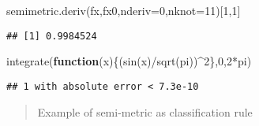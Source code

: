 \documentclass[
]{book}
\newenvironment{Shaded}{\begin{snugshade}}{\end{snugshade}}
\newcommand{\AttributeTok}[1]{\textcolor[rgb]{0.77,0.63,0.00}{#1}}
\newcommand{\CommentTok}[1]{\textcolor[rgb]{0.56,0.35,0.01}{\textit{#1}}}
\newcommand{\ControlFlowTok}[1]{\textcolor[rgb]{0.13,0.29,0.53}{\textbf{#1}}}
\newcommand{\DecValTok}[1]{\textcolor[rgb]{0.00,0.00,0.81}{#1}}
\newcommand{\FunctionTok}[1]{\textcolor[rgb]{0.00,0.00,0.00}{#1}}
\newcommand{\NormalTok}[1]{#1}
\newcommand{\OtherTok}[1]{\textcolor[rgb]{0.56,0.35,0.01}{#1}}
\newcommand{\SpecialCharTok}[1]{\textcolor[rgb]{0.00,0.00,0.00}{#1}}
\begin{document}
\begin{Shaded}
\begin{Highlighting}[]
\FunctionTok{semimetric.deriv}\NormalTok{(fx,fx0,}\AttributeTok{nderiv=}\DecValTok{0}\NormalTok{,}\AttributeTok{nknot=}\DecValTok{11}\NormalTok{)[}\DecValTok{1}\NormalTok{,}\DecValTok{1}\NormalTok{]}
\end{Highlighting}
\end{Shaded}

\begin{verbatim}
## [1] 0.9984524
\end{verbatim}

\begin{Shaded}
\begin{Highlighting}[]
\FunctionTok{integrate}\NormalTok{(}\ControlFlowTok{function}\NormalTok{(x)\{(}\FunctionTok{sin}\NormalTok{(x)}\SpecialCharTok{/}\FunctionTok{sqrt}\NormalTok{(pi))}\SpecialCharTok{\^{}}\DecValTok{2}\NormalTok{\},}\DecValTok{0}\NormalTok{,}\DecValTok{2}\SpecialCharTok{*}\NormalTok{pi)}
\end{Highlighting}
\end{Shaded}

\begin{verbatim}
## 1 with absolute error < 7.3e-10
\end{verbatim}

\begin{quote}
Example of semi-metric as classification rule
\end{quote}

\begin{Shaded}
\end{Shaded}
\end{document}
